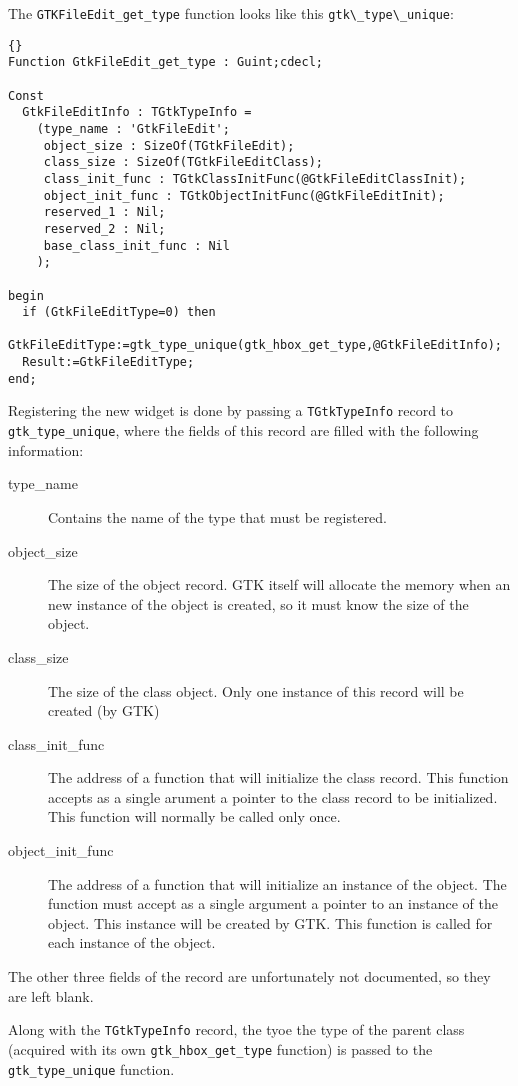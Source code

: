 \documentclass[10pt]{article}
\begin{document}
The \lstinline|GTKFileEdit_get_type| function looks like this
\lstinline|gtk\_type\_unique|:
\begin{lstlisting}{}
Function GtkFileEdit_get_type : Guint;cdecl;

Const
  GtkFileEditInfo : TGtkTypeInfo =
    (type_name : 'GtkFileEdit';   
     object_size : SizeOf(TGtkFileEdit);
     class_size : SizeOf(TGtkFileEditClass);
     class_init_func : TGtkClassInitFunc(@GtkFileEditClassInit);
     object_init_func : TGtkObjectInitFunc(@GtkFileEditInit);   
     reserved_1 : Nil;
     reserved_2 : Nil;
     base_class_init_func : Nil
    );

begin
  if (GtkFileEditType=0) then
    GtkFileEditType:=gtk_type_unique(gtk_hbox_get_type,@GtkFileEditInfo);
  Result:=GtkFileEditType;  
end;
\end{lstlisting}
Registering the new widget is done by passing a \lstinline|TGtkTypeInfo| 
record to \lstinline|gtk_type_unique|, where the fields of this record 
are filled with the following information:
\begin{description}
\item[type\_name] Contains the name of the type that must be registered. 
\item[object\_size] The size of the object record. GTK itself will allocate 
the memory when an new instance of the object is created, so it must know the
size of the object.  
\item[class\_size] The size of the class object. Only one instance of this
record will be created (by GTK)
\item[class\_init\_func] The address of a function that will initialize the
class record. This function accepts as a single arument a pointer to the
class record to be initialized. This function will normally be called only
once.
\item[object\_init\_func] The address of a function that will initialize 
an instance of the object. The function must accept as a single argument
a pointer to an instance of the object. This instance will be created by 
GTK. This function is called for each instance of the object.
\end{description}
The other three fields of the record are unfortunately not documented, so
they are left blank. 

Along with the \lstinline|TGtkTypeInfo| record, the tyoe the type of the 
parent class (acquired with its own \lstinline|gtk_hbox_get_type| 
function) is passed to the \lstinline|gtk_type_unique| function. 
\end{document}
